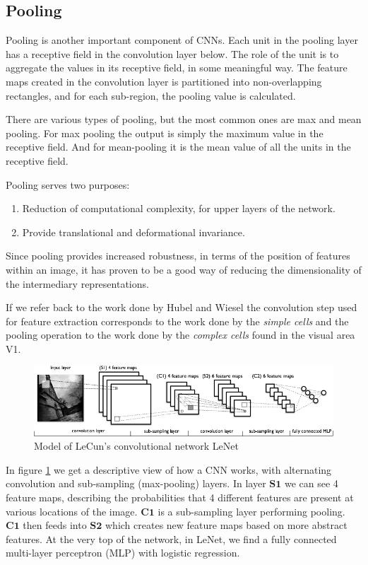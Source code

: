 \documentclass[11pt]{article}
\begin{document}
\subsection{Pooling}

Pooling is another important component of CNNs.  Each unit in the pooling layer has a receptive field in the convolution layer below.  The role of the unit is to aggregate the values in its receptive field, in some meaningful way.  The feature maps created in the convolution layer is partitioned into non-overlapping rectangles, and for each sub-region, the pooling value is calculated.

There are various types of pooling, but the most common ones are max and mean pooling.  For max pooling the output is simply the maximum value in the receptive field.  And for mean-pooling it is the mean value of all the units in the receptive field.

Pooling serves two purposes:

\begin{enumerate}
\item Reduction of computational complexity, for upper layers of the network.
\item Provide translational and deformational invariance.
\end{enumerate}

Since pooling provides increased robustness, in terms of the position of features within an image, it has proven to be a good way of reducing the dimensionality of the intermediary representations.

If we refer back to the work done by Hubel and Wiesel the convolution step used for feature extraction corresponds to the work done by the \textit{simple cells} and the pooling operation to the work done by the \textit{complex cells} found in the visual area V1.

\begin{figure}[htb]
  \centering
  \includegraphics[width=\textwidth]{mylenet.png}
  \caption{Model of LeCun's convolutional network LeNet}
  \label{fig:mylenet}
\end{figure}

In figure \ref{fig:mylenet} we get a descriptive view of how a CNN works, with alternating convolution and sub-sampling (max-pooling) layers.  In layer $\mathbf{S1}$ we can see 4 feature maps, describing the probabilities that 4 different features are present at various locations of the image.  $\mathbf{C1}$ is a sub-sampling layer performing pooling.  $\mathbf{C1}$ then feeds into $\mathbf{S2}$ which creates new feature maps based on more abstract features.  At the very top of the network, in LeNet, we find a fully connected multi-layer perceptron (MLP) with logistic regression.
\end{document}
